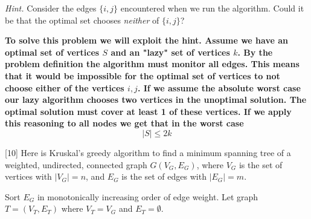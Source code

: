 \documentclass[addpoints]{exam}
\def\mysolution#1{}    %
\begin{document}
\begin{questions}

{\em Hint.} Consider the edges $\{i,j\}$ encountered when we run the algorithm. Could it be that the optimal set chooses {\em neither} of $\{i,j\}$?

\textbf{To solve this problem we will exploit the hint. Assume we have an optimal set of vertices $S$ and an "lazy" set of vertices $k$. By the problem definition the algorithm must monitor all edges. This means that it would be impossible for the optimal set of vertices to not choose either of the vertices ${i,j}$. If we assume the absolute worst case our lazy algorithm chooses two vertices in the unoptimal solution. The optimal solution must cover at least 1 of these vertices. If we apply this reasoning to all nodes we get that in the worst case}
\[|S| \le 2k\]

\mysolution{

}

[10]
Here is Kruskal's greedy algorithm to find a minimum spanning tree of a weighted, undirected, connected graph $G(V_G,E_G)$, where $V_G$ is the set of vertices with $|V_G|=n$, and $E_G$ is the set of edges with $|E_G|=m$.
\begin{algorithmic}[1]
    \State Sort $E_G$ in monotonically increasing order of edge weight.
    \State Let graph $T=(V_T,E_T)$ where $V_T=V_G$ and $E_T=\emptyset$.
    

\end{algorithmic}
\end{questions}
\end{document}
